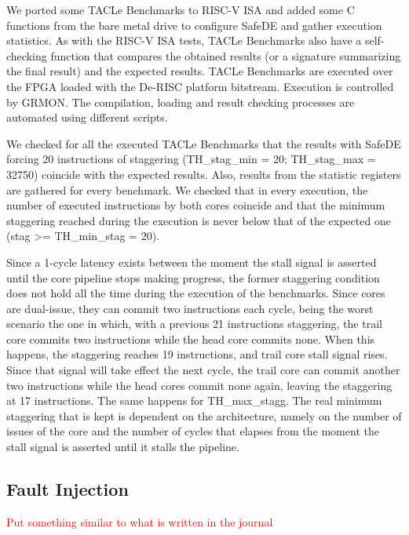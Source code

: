 We ported some TACLe Benchmarks to RISC-V ISA and added some C functions from the bare metal drive to configure SafeDE and gather execution statistics. As with the RISC-V ISA tests, TACLe Benchmarks also have a self-checking function that compares the obtained results (or a signature summarizing the final result) and the expected results. TACLe Benchmarks are executed over the FPGA loaded with the De-RISC platform bitstream. Execution is controlled by GRMON. The compilation, loading and result checking processes are automated using different scripts. 

We checked for all the executed TACLe Benchmarks that the results with SafeDE forcing 20 instructions of staggering (TH\_stag\_min = 20; TH\_stag\_max = 32750) coincide with the expected results. Also, results from the statistic registers are gathered for every benchmark. We checked that in every execution, the number of executed instructions by both cores coincide and that the minimum staggering reached during the execution is never below that of the expected one (stag >= TH\_min\_stag = 20). 

Since a 1-cycle latency exists between the moment the stall signal is asserted until the core pipeline stops making progress, the former staggering condition does not hold all the time during the execution of the benchmarks. Since cores are dual-issue, they can commit two instructions each cycle, being the worst scenario the one in which, with a previous 21 instructions staggering, the trail core commits two instructions while the head core commits none. When this happens, the staggering reaches 19 instructions, and trail core stall signal rises. Since that signal will take effect the next cycle, the trail core can commit another two instructions while the head cores commit none again, leaving the staggering at 17 instructions. The same happens for TH\_max\_stagg. The real minimum staggering that is kept is dependent on the architecture, namely on the number of issues of the core and the number of cycles that elapses from the moment the stall signal is asserted until it stalls the pipeline. 

\bigskip



\subsection{Fault Injection}
\textcolor{red}{Put something similar to what is written in the journal}



